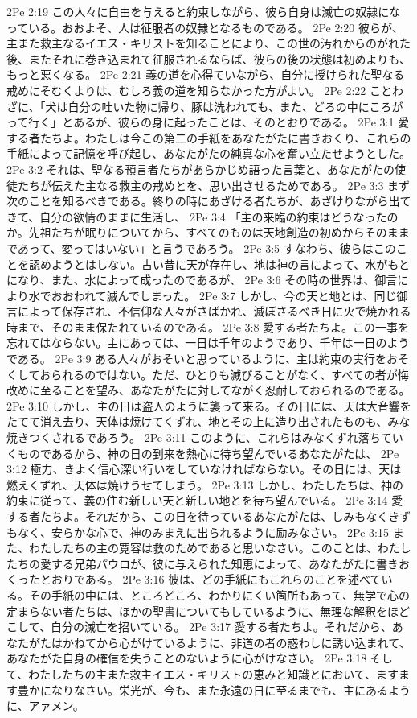 2Pe 2:19  この人々に自由を与えると約束しながら、彼ら自身は滅亡の奴隷になっている。おおよそ、人は征服者の奴隷となるものである。
2Pe 2:20  彼らが、主また救主なるイエス・キリストを知ることにより、この世の汚れからのがれた後、またそれに巻き込まれて征服されるならば、彼らの後の状態は初めよりも、もっと悪くなる。
2Pe 2:21  義の道を心得ていながら、自分に授けられた聖なる戒めにそむくよりは、むしろ義の道を知らなかった方がよい。
2Pe 2:22  ことわざに、「犬は自分の吐いた物に帰り、豚は洗われても、また、どろの中にころがって行く」とあるが、彼らの身に起ったことは、そのとおりである。
2Pe 3:1  愛する者たちよ。わたしは今この第二の手紙をあなたがたに書きおくり、これらの手紙によって記憶を呼び起し、あなたがたの純真な心を奮い立たせようとした。
2Pe 3:2  それは、聖なる預言者たちがあらかじめ語った言葉と、あなたがたの使徒たちが伝えた主なる救主の戒めとを、思い出させるためである。
2Pe 3:3  まず次のことを知るべきである。終りの時にあざける者たちが、あざけりながら出てきて、自分の欲情のままに生活し、
2Pe 3:4  「主の来臨の約束はどうなったのか。先祖たちが眠りについてから、すべてのものは天地創造の初めからそのままであって、変ってはいない」と言うであろう。
2Pe 3:5  すなわち、彼らはこのことを認めようとはしない。古い昔に天が存在し、地は神の言によって、水がもとになり、また、水によって成ったのであるが、
2Pe 3:6  その時の世界は、御言により水でおおわれて滅んでしまった。
2Pe 3:7  しかし、今の天と地とは、同じ御言によって保存され、不信仰な人々がさばかれ、滅ぼさるべき日に火で焼かれる時まで、そのまま保たれているのである。
2Pe 3:8  愛する者たちよ。この一事を忘れてはならない。主にあっては、一日は千年のようであり、千年は一日のようである。
2Pe 3:9  ある人々がおそいと思っているように、主は約束の実行をおそくしておられるのではない。ただ、ひとりも滅びることがなく、すべての者が悔改めに至ることを望み、あなたがたに対してながく忍耐しておられるのである。
2Pe 3:10  しかし、主の日は盗人のように襲って来る。その日には、天は大音響をたてて消え去り、天体は焼けてくずれ、地とその上に造り出されたものも、みな焼きつくされるであろう。
2Pe 3:11  このように、これらはみなくずれ落ちていくものであるから、神の日の到来を熱心に待ち望んでいるあなたがたは、
2Pe 3:12  極力、きよく信心深い行いをしていなければならない。その日には、天は燃えくずれ、天体は焼けうせてしまう。
2Pe 3:13  しかし、わたしたちは、神の約束に従って、義の住む新しい天と新しい地とを待ち望んでいる。
2Pe 3:14  愛する者たちよ。それだから、この日を待っているあなたがたは、しみもなくきずもなく、安らかな心で、神のみまえに出られるように励みなさい。
2Pe 3:15  また、わたしたちの主の寛容は救のためであると思いなさい。このことは、わたしたちの愛する兄弟パウロが、彼に与えられた知恵によって、あなたがたに書きおくったとおりである。
2Pe 3:16  彼は、どの手紙にもこれらのことを述べている。その手紙の中には、ところどころ、わかりにくい箇所もあって、無学で心の定まらない者たちは、ほかの聖書についてもしているように、無理な解釈をほどこして、自分の滅亡を招いている。
2Pe 3:17  愛する者たちよ。それだから、あなたがたはかねてから心がけているように、非道の者の惑わしに誘い込まれて、あなたがた自身の確信を失うことのないように心がけなさい。
2Pe 3:18  そして、わたしたちの主また救主イエス・キリストの恵みと知識とにおいて、ますます豊かになりなさい。栄光が、今も、また永遠の日に至るまでも、主にあるように、アァメン。



